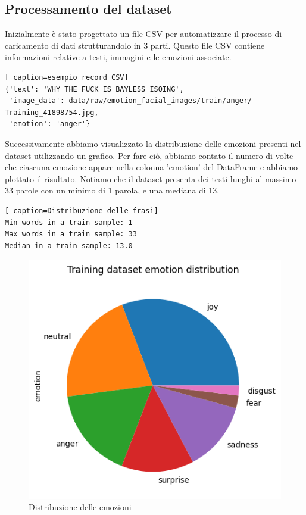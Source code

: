 \documentclass{article}
\begin{document}
\subsection{Processamento del dataset}
Inizialmente è stato progettato un file CSV per automatizzare il processo di caricamento di dati strutturandolo in $3$ parti. Questo file CSV contiene informazioni relative a testi, immagini e le emozioni associate.
\begin{lstlisting}[ caption=esempio record CSV]
{'text': 'WHY THE FUCK IS BAYLESS ISOING',
 'image_data': data/raw/emotion_facial_images/train/anger/                    Training_41898754.jpg, 
 'emotion': 'anger'}
\end{lstlisting}

Successivamente abbiamo visualizzato la distribuzione delle emozioni presenti nel dataset utilizzando un grafico. Per fare ciò, abbiamo contato il numero di volte che ciascuna emozione appare nella colonna 'emotion' del DataFrame e abbiamo plottato il risultato. Notiamo che il dataset presenta dei testi lunghi al massimo $33$ parole con un minimo di 1 parola, e una mediana di 13.

\bigskip

\begin{lstlisting}[ caption=Distribuzione delle frasi]
Min words in a train sample: 1
Max words in a train sample: 33
Median in a train sample: 13.0
\end{lstlisting}

\bigskip

\begin{figure}[!h]
    \centering
    \includegraphics[width=0.6\linewidth]{pieChart.png}
    \caption{Distribuzione delle emozioni}
    \label{fig:dis-emo}
\end{figure}

\bigskip
\end{document}
